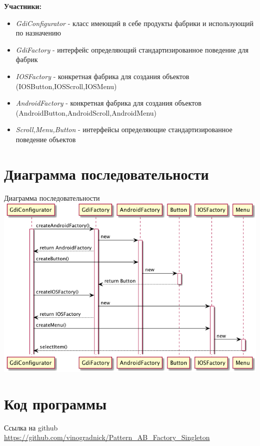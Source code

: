 \documentclass[PI,LAB]{HSEUniversity}
\begin{document}
\textbf{Участники:}
\begin{itemize}
	\item \emph{GdiConfigurator} - класс имеющий в себе продукты фабрики и использующий по назначению
	\item \emph{GdiFactory} - интерфейс определяющий стандартизированное поведение для фабрик
	\item \emph{IOSFactory} - конкретная фабрика для создания объектов  (IOSButton,IOSScroll,IOSMenu)
	\item \emph{AndroidFactory} - конкретная фабрика для создания объектов  (AndroidButton,AndroidScroll,AndroidMenu) 
	\item \emph{Scroll,Menu,Button} - интерфейсы определяющие стандартизированное  поведение объектов 
\end{itemize}


\section{Диаграмма последовательности }

\begin{FIGURE}[h]{Диаграмма последовательности\label{fig:example-figure}}
	\includegraphics[width=\textwidth]{../out/diagrams/seq-go/seq-go}
\end{FIGURE}



\section{Код программы }

Ссылка на github \url{https://github.com/vinogradnick/Pattern_AB_Factory_Singleton}
\end{document}
